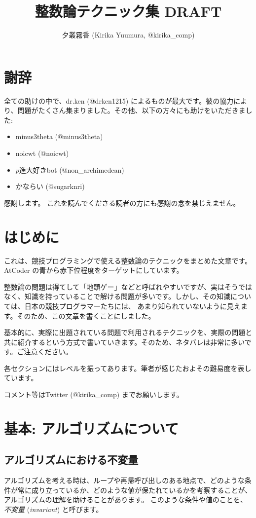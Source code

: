 \documentclass{jsarticle}
\author{夕叢霧香 (Kirika Yuumura, @kirika\_comp)}
\title{整数論テクニック集 DRAFT}
\begin{document}
\maketitle
 \section*{謝辞}
 \label{sec:acknowledgements}
 全ての助けの中で、dr.ken (@drken1215) によるものが最大です。彼の協力により、問題がたくさん集まりました。その他、以下の方々にも助けをいただきました:
 \begin{itemize}
  \item minus3theta (@minus3theta)
  \item noicwt (@noicwt)
  \item $p$進大好きbot (@non\_archimedean)
  \item かならい (@sugarknri)
 \end{itemize}
 感謝します。
 これを読んでくださる読者の方にも感謝の念を禁じえません。
 \section{はじめに}
 これは、競技プログラミングで使える整数論のテクニックをまとめた文章です。
 AtCoder の青から赤下位程度をターゲットにしています。

 整数論の問題は得てして「地頭ゲー」などと呼ばれやすいですが、実はそうではなく、知識を持っていることで解ける問題が多いです。しかし、その知識については、日本の競技プログラマーたちには、
 あまり知られていないように見えます。そのため、この文章を書くことにしました。

 基本的に、実際に出題されている問題で利用されるテクニックを、実際の問題と共に紹介するという方式で書いていきます。そのため、ネタバレは非常に多いです。ご注意ください。

 各セクションにはレベルを振ってあります。筆者が感じたおよその難易度を表しています。

 コメント等はTwitter (@kirika\_comp) までお願いします。
 \section{基本: アルゴリズムについて}
  \subsection{アルゴリズムにおける不変量}
  \label{subsec:invariant}
  アルゴリズムを考える時は、ループや再帰呼び出しのある地点で、どのような条件が常に成り立っているか、どのような値が保たれているかを考察することが、アルゴリズムの理解を助けることがあります。
  このような条件や値のことを、\emph{不変量} (\emph{invariant}) と呼びます。
\end{document}
